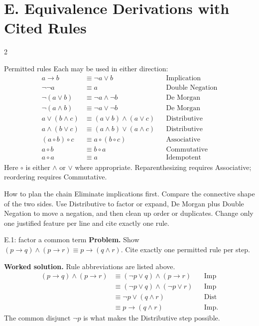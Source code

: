 \documentclass[10pt]{article}
\begin{document}
\section*{E. Equivalence Derivations with Cited Rules}
\begin{multicols}{2}
\begin{definitionbox}{Permitted rules}
Each may be used in either direction:
\begin{align*}
a\to b&\equiv\neg a\lor b &&\text{Implication}\tag{Imp}\\
\neg\neg a&\equiv a &&\text{Double Negation}\tag{DN}\\
\neg(a\lor b)&\equiv\neg a\land\neg b &&\text{De Morgan}\tag{DM}\\
\neg(a\land b)&\equiv\neg a\lor\neg b &&\text{De Morgan}\tag{DM}\\
a\lor(b\land c)&\equiv(a\lor b)\land(a\lor c) &&\text{Distributive}\tag{Dist}\\
a\land(b\lor c)&\equiv(a\land b)\lor(a\land c) &&\text{Distributive}\tag{Dist}\\
(a\circ b)\circ c&\equiv a\circ(b\circ c) &&\text{Associative}\tag{Assoc}\\
a\circ b&\equiv b\circ a &&\text{Commutative}\tag{Comm}\\
a\circ a&\equiv a &&\text{Idempotent}\tag{Idem}
\end{align*}
Here $\circ$ is either $\land$ or $\lor$ where appropriate. Reparenthesizing
requires Associative; reordering requires Commutative.
\end{definitionbox}

\begin{methodbox}{How to plan the chain}
Eliminate implications first. Compare the connective shape of the two sides.
Use Distributive to factor or expand, De Morgan plus Double Negation to move a
negation, and then clean up order or duplicates. Change only one justified
feature per line and cite exactly one rule.
\end{methodbox}

\begin{workedbox}{E.1: factor a common term}
\textbf{Problem.} Show $(p\to q)\land(p\to r)\equiv p\to(q\land r)$. Cite exactly one permitted rule per step.

\textbf{Worked solution.} Rule abbreviations are listed above.
\begin{align*}
(p\to q)\land(p\to r)
&\equiv(\neg p\lor q)\land(p\to r) &&\text{Imp}\\
&\equiv(\neg p\lor q)\land(\neg p\lor r) &&\text{Imp}\\
&\equiv\neg p\lor(q\land r) &&\text{Dist}\\
&\equiv p\to(q\land r) &&\text{Imp}.
\end{align*}
The common disjunct $\neg p$ is what makes the Distributive step possible.


\end{workedbox}
\end{multicols}
\end{document}
